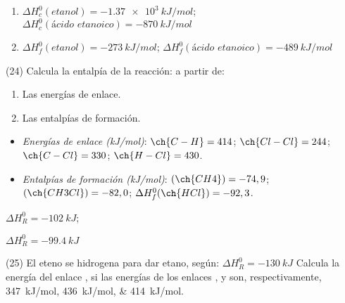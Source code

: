 \documentclass[10pt]{article}
\newenvironment{gexdatos}{
      \noindent\makebox[0pt][r]{\textit{Datos:}}
    }{\vspace{5pt}}
\begin{document}
\begin{multicols}{2}
\begin{solution}
  \begin{enumerate}
    \item \( \Delta H^0_c (\textit{etanol}) = \SI{-1.37e3}{kJ/mol} \);
          \( \Delta H^0_c (\textit{ácido etanoico}) = \SI{-870}{kJ/mol} \)
    \item \( \Delta H^0_f (\textit{etanol}) = \SI{-273}{kJ/mol} \); \newline
          \( \Delta H^0_f (\textit{ácido etanoico}) = \SI{-489}{kJ/mol} \)
  \end{enumerate}
\end{solution}




\begin{exercise}[
    tags    = {},
    topics  = {química, termodinámica, termoquímica},
    source  = {FQ 1B MGH 2016, p168, e24},
  ]
  (24) Calcula la entalpía de la reacción:
   a partir de:
  \begin{enumerate}
    \item Las energías de enlace.
    \item Las entalpías de formación.
  \end{enumerate}

  \begin{gexdatos}
    \begin{itemize}
      \item \textit{Energías de enlace (\si{kJ/mol})}:
      \( \ch{C-H} = 414 \); \( \ch{Cl-Cl} = 244 \); \( \ch{C-Cl} = 330 \); \( \ch{H-Cl} = 430 \).
      \item \textit{Entalpías de formación (\si{kJ/mol})}:
      \( (\ch{CH4}) = -74,9 \); \( (\ch{CH3Cl}) = -82,0 \); \( \Delta H^0_f (\ch{HCl}) = -92,3 \).
    \end{itemize}
  \end{gexdatos}

\end{exercise}

\begin{solution}
  \begin{enumerate*}
    \item \( \Delta H^0_R = \SI{-102}{kJ} \); \item \( \Delta H^0_R = \SI{-99.4}{kJ} \)
  \end{enumerate*}
\end{solution}




\begin{exercise}[
    tags    = {},
    topics  = {química, termodinámica, termoquímica},
    source  = {FQ 1B MGH 2016, p168, e25},
  ]
  (25) El eteno se hidrogena para dar etano, según:
   \( \Delta H^0_R = \SI{-130}{kJ} \)
  Calcula la energía del enlace , si las energías de los
  enlaces ,  y  son, respectivamente, \SIlist{347;436;414}{kJ/mol}.
\end{exercise}


\end{multicols}
\end{document}
